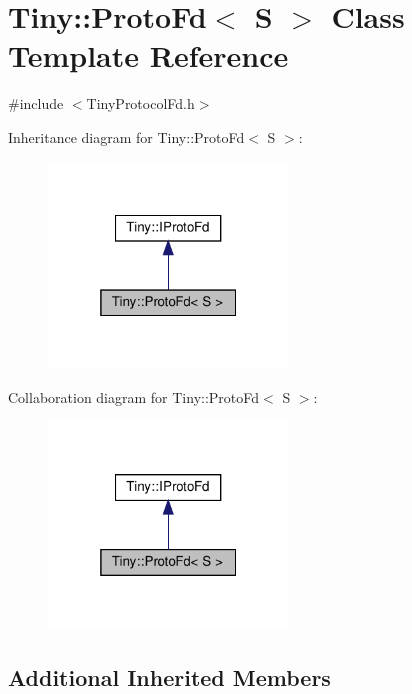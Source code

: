 \hypertarget{classTiny_1_1ProtoFd}{}\section{Tiny\+:\+:Proto\+Fd$<$ S $>$ Class Template Reference}
\label{classTiny_1_1ProtoFd}


{\ttfamily \#include $<$Tiny\+Protocol\+Fd.\+h$>$}



Inheritance diagram for Tiny\+:\+:Proto\+Fd$<$ S $>$\+:\nopagebreak
\begin{figure}[H]
\begin{center}
\leavevmode
\includegraphics[width=181pt]{classTiny_1_1ProtoFd__inherit__graph}
\end{center}
\end{figure}


Collaboration diagram for Tiny\+:\+:Proto\+Fd$<$ S $>$\+:\nopagebreak
\begin{figure}[H]
\begin{center}
\leavevmode
\includegraphics[width=181pt]{classTiny_1_1ProtoFd__coll__graph}
\end{center}
\end{figure}
\subsection*{Additional Inherited Members}


